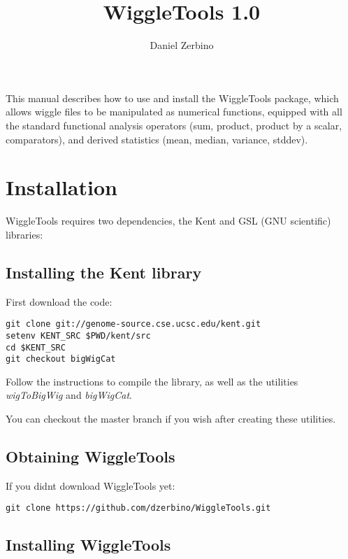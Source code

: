 \documentclass[12pt]{article}
\begin{document}
\title{WiggleTools 1.0}
\author{Daniel Zerbino}
\date{}
\maketitle

This manual describes how to use and install the WiggleTools package, which allows wiggle files to be manipulated as numerical functions, equipped with all the standard functional analysis operators (sum, product, product by a scalar, comparators), and derived statistics (mean, median, variance, stddev).

\tableofcontents

\section{Installation}

WiggleTools requires two dependencies, the Kent and GSL (GNU scientific) libraries:

\subsection{Installing the Kent library}

First download the code:

\begin{verbatim}
git clone git://genome-source.cse.ucsc.edu/kent.git
setenv KENT_SRC $PWD/kent/src
cd $KENT_SRC
git checkout bigWigCat
\end{verbatim}

Follow the instructions to compile the library, as well as the utilities \emph{wigToBigWig} and \emph{bigWigCat}.

You can checkout the master branch if you wish after creating these utilities. 

\subsection{Obtaining WiggleTools}

If you didnt download WiggleTools yet:

\begin{verbatim}
git clone https://github.com/dzerbino/WiggleTools.git
\end{verbatim}

\subsection{Installing WiggleTools}
\end{document}
